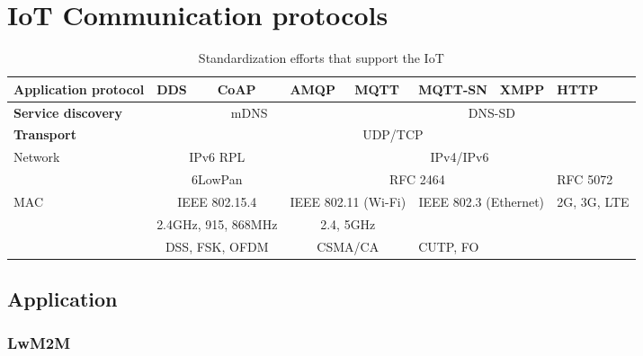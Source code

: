 \section{IoT Communication protocols}


\begin{table}[h!]
\scriptsize
	\begin{tabular}{l|l|l|l|l|l|l|l}

	\bf{Application protocol}& DDS                                     & CoAP                              & AMQP                              & MQTT                                & MQTT-SN & XMPP & HTTP\\\hline
	\bf{Service discovery}   & \multicolumn{3}{c}{mDNS}                & \multicolumn{4}{c}{DNS-SD}                                                                                                         \\
	\bf{Transport}           & \multicolumn{7}{c}{UDP/TCP}                                                    \\
	Network                  & \multicolumn{2}{c}{IPv6 RPL}            & \multicolumn{5}{c}{IPv4/IPv6}                            \\\hline
	\                        & \multicolumn{2}{c}{6LowPan}             & \multicolumn{4}{c}{RFC 2464}                & RFC 5072   \\\hline
	MAC                      & \multicolumn{2}{c}{IEEE 802.15.4}       & \multicolumn{2}{c}{IEEE 802.11 (Wi-Fi)} & \multicolumn{2}{c}{IEEE 802.3 (Ethernet)} & 2G, 3G, LTE\\\hline
	\                        & \multicolumn{2}{c}{2.4GHz, 915, 868MHz} & \multicolumn{2}{c}{2.4, 5GHz}           &         &              &            \\\hline
	\                        & \multicolumn{2}{c}{DSS, FSK, OFDM }     & \multicolumn{2}{c}{CSMA/CA}             & CUTP, FO               &            \\\hline
	\end{tabular}
	\caption{\label{tab:Table} Standardization efforts that support the IoT}
\end{table}


\subsection{Application}

\subsubsection{LwM2M}
